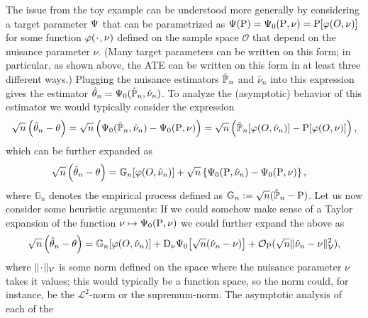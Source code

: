 \documentclass[a4,danish]{article}
\begin{document}
The issue from the toy example can be understood more generally by considering a target parameter
$\operatorname{\Psi}$ that can be parametrized as $\operatorname{\Psi}(\mathrm{{P}}) = \operatorname{\Psi}_0(\mathrm{{P}}, \nu) = \mathrm{{P}}[\varphi(O, \nu)]$ for some function
$\phi(\blank, \nu)$ defined on the sample space $\mathcal{O}$ that depend on the nuisance parameter
$\nu$. (Many target parameters can be written on this form; in particular, as shown above, the ATE
can be written on this form in at least three different ways.) Plugging the nuisance estimators
$\hat{\mathbb{P}}_n$ and $\hat{\nu}_n$ into this expression gives the estimator
$\hat{\theta}_n = \operatorname{\Psi}_0(\hat{\mathbb{P}}_n, \hat{\nu}_n)$. To analyze the (asymptotic) behavior of this
estimator we would typically consider the expression
\begin{equation*}
  \sqrt{n}
  \left(
    \hat{\theta}_n - \theta
  \right)
  =  \sqrt{n}
  \left(
    \operatorname{\Psi}_0(\hat{\mathbb{P}}_n,\hat{\nu}_n) - \operatorname{\Psi}_0(\mathrm{{P}},\nu)
  \right) =
  \sqrt{n}
  \left(
    \hat{\mathbb{P}}_n[\varphi(O, \hat{\nu}_n)] -
    \mathrm{{P}}[\varphi(O, \nu)]
  \right),
\end{equation*}
which can be further expanded as
\begin{align*}
  \sqrt{n}
  \left(
  \hat{\theta}_n - \theta
  \right) & =
            {\mathbb{G}_{n}{\left[\varphi( O, \hat{\nu}_n)\right]}}
            + \sqrt{n}
            \left\{
            \operatorname{\Psi}_0(\mathrm{{P}},\hat{\nu}_n) - \operatorname{\Psi}_0(\mathrm{{P}},\nu)
            \right\},
\end{align*}
where $\mathbb{G}_n$ denotes the empirical process defined as
$\mathbb{G}_n := \sqrt{n}(\hat{\mathbb{P}}_n - \mathrm{{P}})$. Let us now consider some heuristic arguments: If we could
somehow make sense of a Taylor expansion of the function $\nu \mapsto \operatorname{\Psi}_0(\mathrm{{P}}, \nu)$ we could
further expand the above as
\begin{equation}
  \label{eq:target-decom}
  \sqrt{n}
  \left(
    \hat{\theta}_n - \theta
  \right)
  = {\mathbb{G}_{n}{\left[\varphi( O, \hat{\nu}_n)\right]}}
  + \mathrm{D_{\nu}{\operatorname{\Psi}_0}}{ \left[
      \sqrt{n}(\hat{\nu}_n - \nu)
    \right]}
  + 
  \mathcal{O}_{\mathrm{{P}}}(\sqrt{n}\Vert \hat{\nu}_n - \nu \Vert_{\mathcal{V}}^2),
\end{equation}
where $\Vert \blank \Vert_{\mathcal{V}}$ is some norm defined on the space where the nuisance
parameter $\nu$ takes it values; this would typically be a function space, so the norm could, for
instance, be the $\mathcal{L}^2$-norm or the supremum-norm. The asymptotic analysis of each of the
\end{document}
